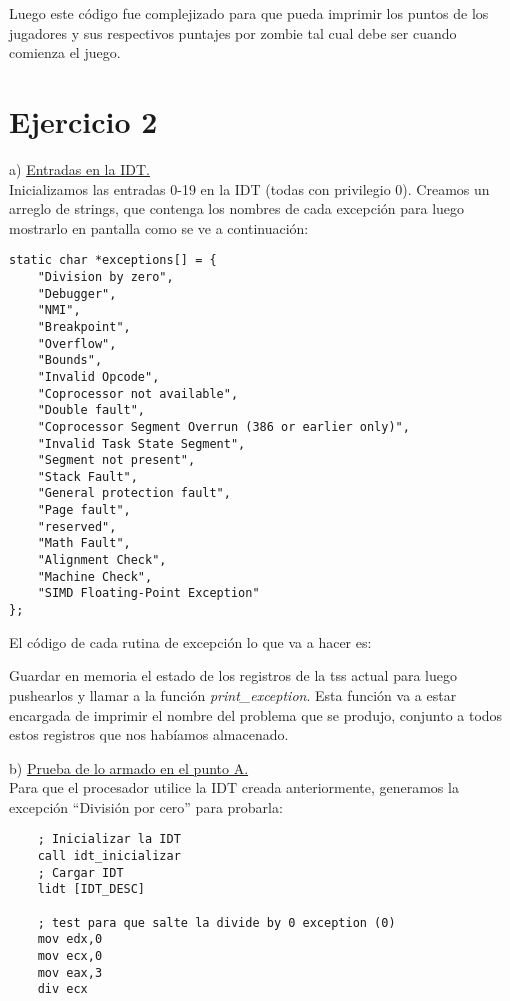 \documentclass[a4paper]{article}
\begin{document}
Luego este c\'odigo fue complejizado para que pueda imprimir los puntos de los jugadores y sus respectivos puntajes por zombie tal cual debe ser cuando comienza el juego.

\newpage
\section{Ejercicio 2}
{\large a)} \underline{Entradas en la IDT.}\\

Inicializamos las entradas 0-19 en la IDT (todas con privilegio 0). Creamos un arreglo de strings, que contenga los nombres de cada excepci\'on para luego mostrarlo en pantalla como se ve a continuaci\'on:

\begin{codesnippet}
\begin{verbatim}
static char *exceptions[] = {
    "Division by zero",
    "Debugger",
    "NMI",
    "Breakpoint",
    "Overflow",
    "Bounds",
    "Invalid Opcode",
    "Coprocessor not available",
    "Double fault",
    "Coprocessor Segment Overrun (386 or earlier only)",
    "Invalid Task State Segment",
    "Segment not present",
    "Stack Fault",
    "General protection fault",
    "Page fault",
    "reserved",
    "Math Fault",
    "Alignment Check",
    "Machine Check",
    "SIMD Floating-Point Exception"
};
\end{verbatim}
\end{codesnippet}

El c\'odigo de cada rutina de excepci\'on lo que va a hacer es:

Guardar en memoria el estado de los registros de la tss actual para luego pushearlos y llamar a la funci\'on \emph{print_exception}. Esta funci\'on va a estar encargada de imprimir el nombre del problema que se produjo, conjunto a todos estos registros que nos hab\'iamos almacenado. \\
\bigskip

{\large b)} \underline{Prueba de lo armado en el punto A.}\\

Para que el procesador utilice la IDT creada anteriormente, generamos la excepci\'on ``Divisi\'on por cero'' para probarla:

\begin{codesnippet}
\begin{verbatim}
    ; Inicializar la IDT
    call idt_inicializar
    ; Cargar IDT
    lidt [IDT_DESC]

    ; test para que salte la divide by 0 exception (0)
    mov edx,0
    mov ecx,0
    mov eax,3
    div ecx
\end{verbatim}
\end{codesnippet}
\end{document}
